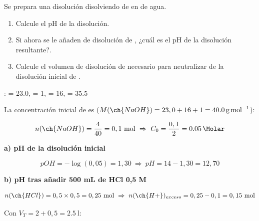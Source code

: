 \begin{exerciseEVAU}
    Se prepara una disolución disolviendo  de  en  de agua.
    \begin{enumerate}[label=\letraminuscula]
        \item Calcule el pH de la disolución.
        \item Si ahora se le añaden  de disolución  de , ¿cuál es el pH de la disolución resultante?.
        \item Calcule el volumen de disolución  de  necesario para neutralizar  de la disolución inicial de  .
    \end{enumerate}
    \datos{}:  = \num{23.0},  = \num{1},  = \num{16},  = \num{35.5}


    \begin{solu}
%

        La concentración inicial de  es (\(M(\ch{NaOH}) = 23,0+16+1 = \SI{40.0}{\gram\per\mole}\)):

        \begin{equation*}
            n(\ch{NaOH}) = \dfrac{4}{40} = 0,1 \ \text{mol} \ \Rightarrow \ C_0 = \dfrac{0,1}{2} = \SI{0.05}{\Molar}
        \end{equation*}

        \textbf{a) pH de la disolución inicial}

        \begin{equation*}
            pOH = -\log(0,05) = 1,30 \ \Rightarrow \ pH = 14-1,30 = 12,70
        \end{equation*}

        \textbf{b) pH tras añadir 500 mL de HCl 0,5 M}

        \begin{equation*}
            n(\ch{HCl}) = 0,5\times0,5 = 0,25 \ \text{mol} \ \Rightarrow \ n(\ch{H+})_{exceso} = 0,25-0,1 = 0,15 \ \text{mol}
        \end{equation*}

        Con \(V_T = 2+0,5 = \SI{2.5}{\litre}\):


\end{solu}
\end{exerciseEVAU}
